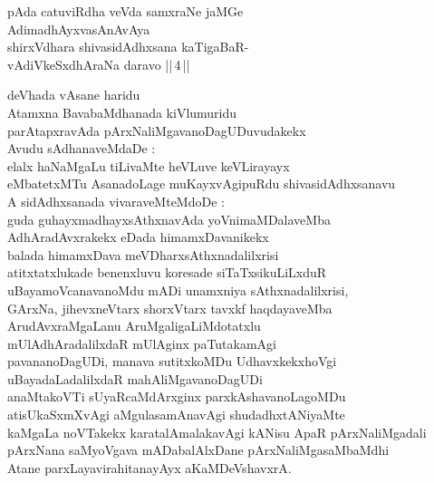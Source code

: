 \begin{entry}
\gl{}
\begin{shl}
pAda catuviRdha veVda samxraNe jaMGe\\
AdimadhAyxvasAnAvAya\\
shirxVdhara shivasidAdhxsana kaTigaBaR-\\
vAdiVkeSxdhAraNa daravo ||\,4\,||
\end{shl}
\begin{shl}
deVhada vAsane haridu\\
Atamxna BavabaMdhanada kiVlumuridu\\
parAtapxravAda pArxNaliMgavanoDagUDuvudakekx\\
Avudu sAdhanaveMdaDe :\\
elalx haNaMgaLu tiLivaMte heVLuve keVLirayayx\\
eMbatetxMTu AsanadoLage muKayxvAgipuRdu shivasidAdhxsanavu\\
A sidAdhxsanada vivaraveMteMdoDe :\\
guda guhayxmadhayxsAthxnavAda yoVnimaMDalaveMba\\
AdhAradAvxrakekx eDada himamxDavanikekx\\
balada himamxDava meVDharxsAthxnadalilxrisi\\
atitxtatxlukade benenxluvu koresade siTaTxsikuLiLxduR\\
uBayamoVcanavanoMdu mADi unamxniya sAthxnadalilxrisi,\\
GArxNa, jihevxneVtarx shorxVtarx tavxkf haqdayaveMba\\
ArudAvxraMgaLanu AruMgaligaLiMdotatxlu\\
mUlAdhAradalilxdaR mUlAginx paTutakamAgi\\
pavananoDagUDi, manava sutitxkoMDu UdhavxkekxhoVgi\\
uBayadaLadalilxdaR mahAliMgavanoDagUDi\\
anaMtakoVTi sUyaRcaMdArxginx parxkAshavanoLagoMDu\\
atisUkaSxmXvAgi aMgulasamAnavAgi shudadhxtANiyaMte\\
kaMgaLa noVTakekx karatalAmalakavAgi kANisu ApaR pArxNaliMgadali\\
pArxNana saMyoVgava mADabalAlxDane pArxNaliMgasaMbaMdhi\\
Atane parxLayavirahitanayAyx aKaMDeVshavxrA.
\end{shl}
\end{entry}

